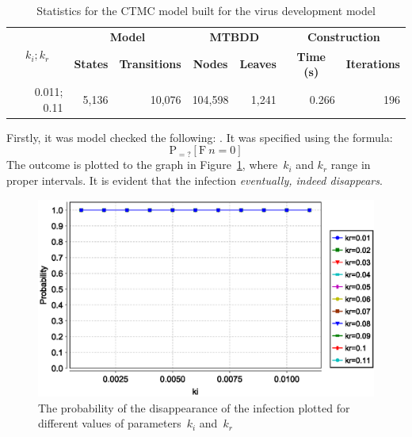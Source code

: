 \documentclass[a4paper, 11pt]{article}
\theoremstyle{definition}
\begin{document}
\begin{table}[hbt]
    \centering

    \begin{tabular}{|r||r|r||r|r||r|r|}
        \hline

        \multicolumn{1}{|c||}{\multirow{2}{*}{$ k_i; k_r $}}
            & \multicolumn{2}{c||}{\textbf{Model}}
            & \multicolumn{2}{c||}{\textbf{MTBDD}}
            & \multicolumn{2}{c|}{\textbf{Construction}} \\ \cline{2-7}

        & \multicolumn{1}{c|}{\textbf{States}}
            & \multicolumn{1}{c||}{\textbf{Transitions}}
            & \multicolumn{1}{c|}{\textbf{Nodes}}
            & \multicolumn{1}{c||}{\textbf{Leaves}}
            & \multicolumn{1}{c|}{\textbf{Time (s)}}
            & \multicolumn{1}{c|}{\textbf{Iterations}} \\ \hline \hline

        0.011; 0.11 & 5,136 & 10,076 & 104,598 & 1,241 & 0.266
            & 196 \\ \hline
    \end{tabular}

    \caption{%
        Statistics for the CTMC model built for the virus development
        model%
    }
    \label{tab:customExpModel}
\end{table}

Firstly, it was model checked the following: . It was specified using
the formula:
$$
    \mathrm{P}_{= ?} [\mathrm{F}\ n = 0]
$$
The outcome is plotted to the graph in Figure~\ref{fig:customExpsExp1},
where~$ k_i $ and $ k_r $ range in proper intervals. It is evident
that the infection \emph{eventually, indeed disappears}.

\begin{figure}[hbt]
    \centering
    \includegraphics[width=.7 \linewidth]{custom-exp-1.eps}
    \caption{%
        The probability of the disappearance of the infection plotted
        for different values of parameters~$ k_i $ and~$ k_r $%
    }
    \label{fig:customExpsExp1}
\end{figure}
\end{document}
